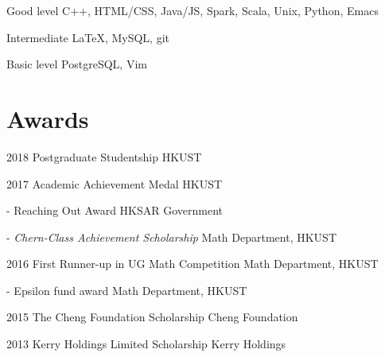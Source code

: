 \documentclass{tccv}
\begin{document}
\begin{factlist}

\item{Good level}
     {C++, HTML/CSS, Java/JS, Spark, Scala, Unix, Python, Emacs}

\item{Intermediate}
     {\LaTeX, MySQL, git}

\item{Basic level}
     {PostgreSQL, Vim}

\end{factlist}

\section{Awards}

\begin{yearlist}

\item{2018}
     {Postgraduate Studentship}
     {HKUST}

\item{2017}
     {Academic Achievement Medal}
     {HKUST}

\item{-}
     {Reaching Out Award}
     {HKSAR Government}

\item{-}
     {\em \small{Chern-Class} \em Achievement Scholarship}
     {Math Department, HKUST}
     
\item{2016}
     {\small{First Runner-up in UG Math Competition}}
     {Math Department, HKUST}     

\item{-}
     {Epsilon fund award}
     {Math Department, HKUST}     


\item{2015}
     {The Cheng Foundation Scholarship}
     {Cheng Foundation}

\item{2013}
     {Kerry Holdings Limited Scholarship}
     {Kerry Holdings }
 
\end{yearlist}
\end{document}
